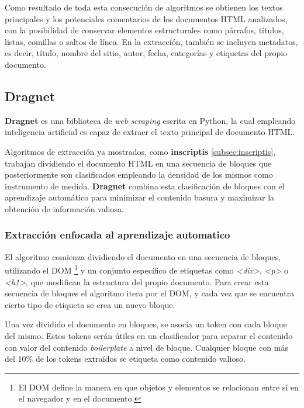 Como resultado de toda esta consecución de algoritmos se obtienen los textos principales y los potenciales
comentarios de los documentos HTML analizados, con la posibilidad de conservar elementos estructurales como
párrafos, títulos, listas, comillas o saltos de línea. En la extracción, también se incluyen metadatos, 
es decir, título, nombre del sitio, autor, fecha, categorías y etiquetas del propio documento.

\subsection{Dragnet}
\label{subsec:dragnet}

\textbf{Dragnet} \cite{dragnet} es una biblioteca de \emph{web scraping} escrita en Python, la cual empleando 
inteligencia artificial es capaz de extraer el texto principal de documento HTML.

Algoritmos de extracción ya mostrados, como \textbf{inscriptis} \ref{subsec:inscriptis}, trabajan dividiendo 
el documento HTML en una secuencia de bloques que posteriormente son clasificados empleando la densidad de 
los mismos como instrumento de medida. \textbf{Dragnet} combina esta clasificación de bloques con el 
aprendizaje automático para minimizar el contenido basura y maximizar la obtención de información valiosa.

\subsubsection{Extracción enfocada al aprendizaje automatico}
\label{subsubsec:extraccion enfocada al aprendizaje automatico}

El algoritmo comienza dividiendo el documento en una secuencia de bloques, utilizando el DOM \footnote{El 
DOM define la manera en que objetos y elementos se relacionan entre sí en el navegador y en el documento.} 
y un conjunto específico de etiquetas como \emph{<div>}, \emph{<p>} o \emph{<h1>}, que modifican la 
estructura del propio documento. Para crear esta secuencia de bloques el algoritmo itera por el DOM, y cada 
vez que se encuentra cierto tipo de etiqueta se crea un nuevo bloque.

Una vez dividido el documento en bloques, se asocia un token con cada bloque del mismo. Estos tokens serán 
útiles en un clasificador para separar el contenido con valor del contenido \emph{boilerplate} a nivel 
de bloque. Cualquier bloque con más del 10\% de los tokens extraídos se etiqueta como contenido valioso.

